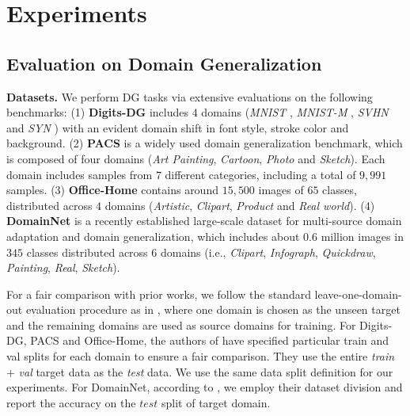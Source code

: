 \documentclass[10pt,twocolumn,letterpaper]{article}
\newcommand{\0}{{\bf 0}}
\begin{document}
\section{Experiments}

\subsection{Evaluation on Domain Generalization}
\textbf{Datasets.} We perform DG tasks via extensive evaluations on the following benchmarks: (1) \textbf{Digits-DG} \cite{zhou2020learning} includes $4$ domains (\textit{MNIST} \cite{lecun1998gradient}, \textit{MNIST-M} \cite{ganin2015unsupervised}, \textit{SVHN} \cite{netzer2011reading} and \textit{SYN} \cite{ganin2015unsupervised}) with an evident domain shift in font style, stroke color and background. (2) \textbf{PACS} \cite{li2017deeper} is a widely used domain generalization benchmark, which is composed of four domains (\textit{Art Painting}, \textit{Cartoon}, \textit{Photo} and \textit{Sketch}). Each domain includes samples from $7$ different categories, including a total of $9,991$ samples. (3) \textbf{Office-Home} \cite{venkateswara2017deep} contains around $15,500$ images of $65$ classes, distributed across $4$ domains (\textit{Artistic}, \textit{Clipart}, \textit{Product} and \textit{Real world}). (4) \textbf{DomainNet} \cite{peng2019moment} is a recently established large-scale dataset for multi-source domain adaptation and domain generalization, which includes about $0.6$ million images in $345$ classes distributed across $6$ domains (i.e., \textit{Clipart}, \textit{Infograph}, \textit{Quickdraw}, \textit{Painting}, \textit{Real}, \textit{Sketch}).

For a fair comparison with prior works, we follow the standard leave-one-domain-out evaluation procedure as in \cite{carlucci2019domain, li2017deeper, li2019episodic}, where one domain is chosen as the unseen target and the remaining domains are used as source domains for training. For Digits-DG, PACS and Office-Home, the authors of \cite{zhou2020learning, zhou2020domain, zhou2021domain} have specified particular train and val splits for each domain to ensure a fair comparison. They use the entire \textit{train} $+$ \textit{val} target data as the \textit{test} data. We use the same data split definition for our experiments. For DomainNet, according to \cite{chattopadhyay2020learning}, we employ their dataset division and report the accuracy on the $\textit{test}$ split of target domain.
\end{document}
